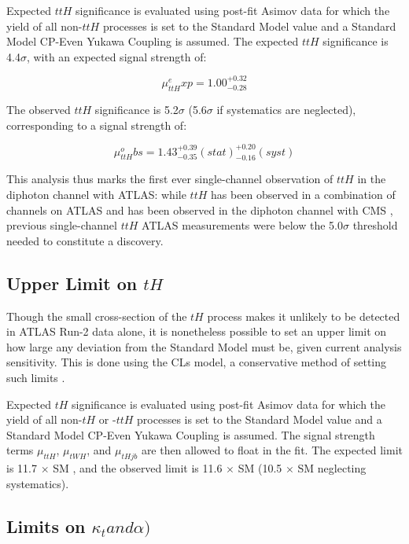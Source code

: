 Expected $ttH$ significance is evaluated using post-fit Asimov data for which the yield of all non-$ttH$ processes is set to the Standard Model value and a Standard Model CP-Even Yukawa Coupling is assumed. The expected $ttH$ significance is 4.4$\sigma$, with an expected signal strength of:
 
\begin{equation}
\mu_{ttH}^exp = 1.00^{+0.32}_{-0.28}
\end{equation}

The observed $ttH$ significance is 5.2$\sigma$ (5.6$\sigma$ if systematics are neglected), corresponding to a signal strength of:

\begin{equation}
\mu_{ttH}^obs = 1.43^{+0.39}_{-0.35}(stat)^{+0.20}_{-0.16}(syst)
\end{equation}
 

This analysis thus marks the first ever single-channel observation of $ttH$ in the diphoton channel with ATLAS: while $ttH$ has been observed in a combination of channels on ATLAS \cite{ttH} and has been observed in the diphoton channel with CMS \cite{ttHCMS}, previous single-channel $ttH$ ATLAS measurements were below the 5.0$\sigma$ threshold needed to constitute a discovery. 
 
\subsection{Upper Limit on $tH$}

Though the small cross-section of the $tH$ process makes it unlikely to be detected in ATLAS Run-2 data alone, it is nonetheless possible to set an upper limit on how large any deviation from the Standard Model must be, given current analysis sensitivity. This is done using the CLs model, a conservative method of setting such limits \cite{CLs}.

Expected $tH$ significance is evaluated using post-fit Asimov data for which the yield of all non-$tH$ or -$ttH$ processes is set to the Standard Model value and a Standard Model CP-Even Yukawa Coupling is assumed. The signal strength terms $\mu_{ttH}$, $\mu_{tWH}$, and $\mu_{tHjb}$ are then allowed to float in the fit. The expected limit is 11.7 $\times$ SM , and the observed limit is 11.6 $\times$ SM (10.5 $\times$ SM neglecting systematics).

\subsection{Limits on $\kappa_{t} and \alpha)$}

